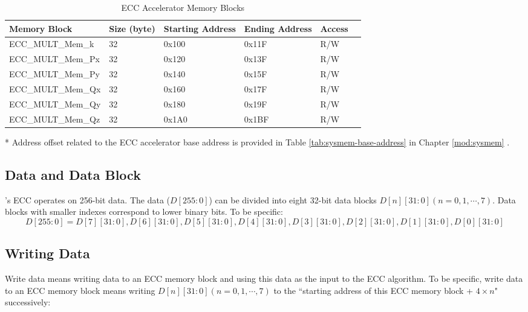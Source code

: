 \documentclass[main\_\_EN.tex]{subfiles}
\begin{document}
\begin{table}[H]
    \centering
    \caption{ECC Accelerator Memory Blocks} \label{tab:ecc-memory}
    \begin{threeparttable}
    \begin{tabular}{ | l | l | l | l | l | l | }
    \hline
        \rowcolor{lightgray}
        \textbf{Memory Block} & \textbf{Size (byte)}  &  \textbf{Starting Address}\tnote{*} &  \textbf{Ending Address} \tnote{*} & \textbf{Access}   \\ \hline
        ECC\_MULT\_Mem\_k    & 32  & 0x100 & 0x11F & R/W \\ \hline
        ECC\_MULT\_Mem\_Px   & 32  & 0x120 & 0x13F & R/W \\ \hline
        ECC\_MULT\_Mem\_Py   & 32  & 0x140 & 0x15F & R/W \\ \hline
        ECC\_MULT\_Mem\_Qx   & 32  & 0x160 & 0x17F & R/W \\ \hline
        ECC\_MULT\_Mem\_Qy   & 32  & 0x180 & 0x19F & R/W \\ \hline
        ECC\_MULT\_Mem\_Qz   & 32  & 0x1A0 & 0x1BF & R/W \\ \hline
    \end{tabular}
    \begin{tablenotes}
        \item[*] Address offset related to the ECC accelerator base address is provided in Table \ref{tab:sysmem-base-address} in Chapter \ref{mod:sysmem} \textit{}.
    \end{tablenotes}
    \end{threeparttable}
\end{table}


\subsection{Data and Data Block}

\chipname{}'s ECC operates on 256-bit data. The data ($D[255:0]$) can be divided into eight 32-bit data blocks $D[n][31:0] (n=0, 1, \cdots, 7)$. Data blocks with smaller indexes correspond to lower binary bits. To be specific:
\[
D[255:0] = {D[7][31:0],D[6][31:0],D[5][31:0],
D[4][31:0],D[3][31:0],D[2][31:0],D[1][31:0],D[0][31:0]}
\]

\subsection{Writing Data}

Write data means writing data to an ECC memory block and using this data as the input to the ECC algorithm. To be specific, write data to an ECC memory block means writing $D[n][31:0] (n=0, 1, \cdots, 7)$ to the ``starting address of this ECC memory block + $4 \times n$" successively:
\end{document}

